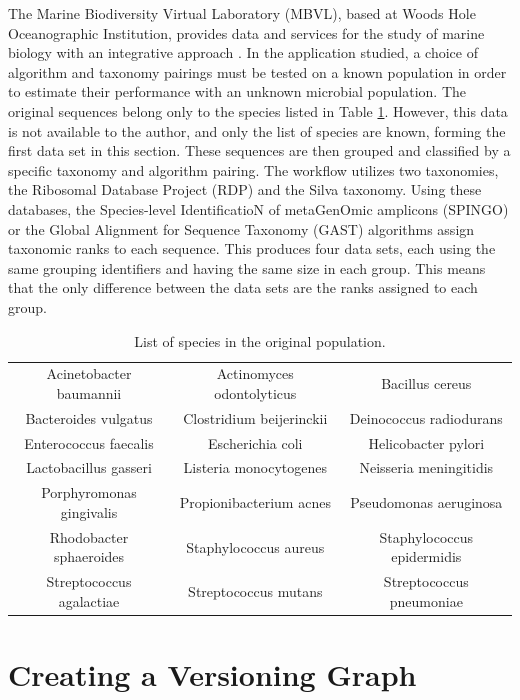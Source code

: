 The Marine Biodiversity Virtual Laboratory (MBVL), based at Woods Hole Oceanographic Institution, provides data and services for the study of marine biology with an integrative approach \cite{mbvl}.
In the application studied, a choice of algorithm and taxonomy pairings must be tested on a known population in order to estimate their performance with an unknown microbial population.
The original sequences belong only to the species listed in Table \ref{species_table}.
However, this data is not available to the author, and only the list of species are known, forming the first data set in this section.
These sequences are then grouped and classified by a specific taxonomy and algorithm pairing.
The workflow utilizes two taxonomies, the Ribosomal Database Project (RDP) and the Silva taxonomy.
Using these databases, the Species-level IdentificatioN of metaGenOmic amplicons (SPINGO) or the Global Alignment for Sequence Taxonomy (GAST) algorithms assign taxonomic ranks to each sequence.
This produces four data sets, each using the same grouping identifiers and having the same size in each group.
This means that the only difference between the data sets are the ranks assigned to each group.

\begin{table}
	\caption{List of species in the original population.}
	\label{species_table}
	\centering
	\setlength{\tabcolsep}{2pt}
	\begin{tabular}{|c|c|c|}
		\hline
		Acinetobacter baumannii & Actinomyces odontolyticus & Bacillus cereus \\
		Bacteroides vulgatus & Clostridium beijerinckii & Deinococcus radiodurans \\
		Enterococcus faecalis & Escherichia coli & Helicobacter pylori \\
		Lactobacillus gasseri & Listeria monocytogenes & Neisseria meningitidis\\
		Porphyromonas gingivalis & Propionibacterium acnes & Pseudomonas aeruginosa \\
		Rhodobacter sphaeroides & Staphylococcus aureus & Staphylococcus epidermidis\\
		Streptococcus agalactiae & Streptococcus mutans & Streptococcus pneumoniae \\
		\hline
	\end{tabular}
\end{table}

\section{Creating a Versioning Graph}

